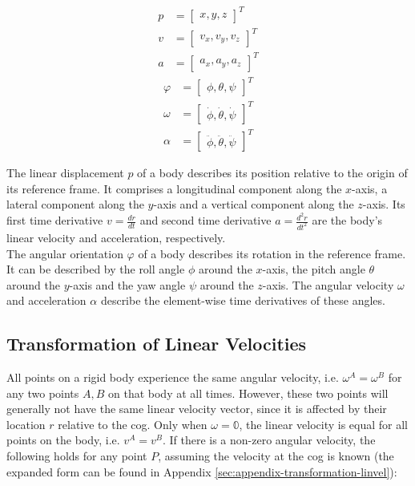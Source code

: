 \begin{subequations}\label{eq:linear-quantities}
\begin{alignat}{2}%
p &= \begin{bmatrix}x, y, z\end{bmatrix}^T \\%
v &= \begin{bmatrix}v_x, v_y, v_z\end{bmatrix}^T \\%
a &= \begin{bmatrix}a_x, a_y, a_z\end{bmatrix}^T%
\end{alignat}
\end{subequations}
\begin{subequations}\label{eq:angular-quantities}
\begin{alignat}{2}%
\varphi &= \begin{bmatrix}\phi, \theta, \psi\end{bmatrix}^T \\%
\omega &= \begin{bmatrix}\dot{\phi}, \dot{\theta}, \dot{\psi}\end{bmatrix}^T \\%
\alpha &= \begin{bmatrix}\ddot{\phi}, \ddot{\theta}, \ddot{\psi}\end{bmatrix}^T%
\end{alignat}
\end{subequations}

The linear displacement $p$ of a body describes its position relative to the origin of its reference frame. It comprises a longitudinal component along the $x$-axis, a lateral component along the $y$-axis and a vertical component along the $z$-axis. Its first time derivative $v = \frac{dr}{dt}$ and second time derivative $a = \frac{d^2r}{dt^2}$ are the body's linear velocity and acceleration, respectively. \\ The angular orientation $\varphi$ of a body describes its rotation in the reference frame. It can be described by the roll angle $\phi$ around the $x$-axis, the pitch angle $\theta$ around the $y$-axis and the yaw angle $\psi$ around the $z$-axis. The angular velocity $\omega$ and acceleration $\alpha$ describe the element-wise time derivatives of these angles.


\subsection{Transformation of Linear Velocities}
All points on a rigid body experience the same angular velocity, i.e. $\omega^A = \omega^B$ for any two points $A, B$ on that body at all times. However, these two points will generally not have the same linear velocity vector, since it is affected by their location $r$ relative to the \gls{cog}. Only when $\omega = \mathbb{0}$, the linear velocity is equal for all points on the body, i.e. $v^A = v^B$. If there is a non-zero angular velocity, the following holds for any point $P$, assuming the velocity at the \gls{cog} is known (the expanded form can be found in Appendix \ref{sec:appendix-transformation-linvel}):

